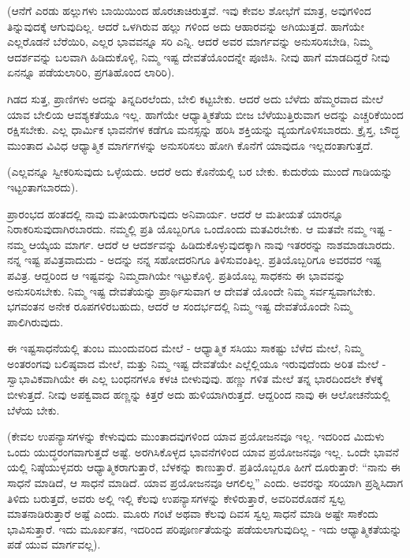 (ಆನೆಗೆ ಎರಡು ಹಲ್ಲುಗಳು ಬಾಯಿಯಿಂದ ಹೊರಚಾಚಿರುತ್ತವೆ. ಇವು ಕೇವಲ ಶೋಭೆಗೆ ಮಾತ್ರ, ಅವುಗಳಿಂದ ತಿನ್ನುವುದಕ್ಕೆ ಆಗುವುದಿಲ್ಲ. ಆದರೆ ಒಳಗಿರುವ ಹಲ್ಲು ಗಳಿಂದ ಅದು ಆಹಾರವನ್ನು ಅಗಿಯುತ್ತದೆ. ಹಾಗೆಯೇ ಎಲ್ಲರೊಡನೆ ಬೆರೆಯಿರಿ, ಎಲ್ಲರ ಭಾವವನ್ನೂ ಸರಿ ಎನ್ನಿ. ಆದರೆ ಅವರ ಮಾರ್ಗವನ್ನು ಅನುಸರಿಸಬೇಡಿ, ನಿಮ್ಮ ಆದರ್ಶವನ್ನು ಬಲವಾಗಿ ಹಿಡಿದುಕೊಳ್ಳಿ, ನಿಮ್ಮ ಇಷ್ಟ ದೇವತೆಯೊಂದನ್ನೇ ಪೂಜಿಸಿ. ನೀವು ಹಾಗೆ ಮಾಡದಿದ್ದರೆ ನೀವು ಏನನ್ನೂ ಪಡೆಯಲಾರಿರಿ, ಪ್ರಗತಿಹೊಂದ ಲಾರಿರಿ).

ಗಿಡದ ಸುತ್ತ, ಪ್ರಾಣಿಗಳು ಅದನ್ನು ತಿನ್ನದಿರಲೆಂದು, ಬೇಲಿ ಕಟ್ಟಬೇಕು. ಆದರೆ ಅದು ಬೆಳೆದು ಹೆಮ್ಮರವಾದ ಮೇಲೆ ಯಾವ ಬೇಲಿಯ ಆವಶ್ಯಕತೆಯೂ ಇಲ್ಲ. ಹಾಗೆಯೇ ಆಧ್ಯಾತ್ಮಿಕತೆಯ ಬೀಜ ಬೆಳೆಯುತ್ತಿರುವಾಗ ಅದನ್ನು ಎಚ್ಚರಿಕೆಯಿಂದ ರಕ್ಷಿಸಬೇಕು. ಎಲ್ಲ ಧಾರ್ಮಿಕ ಭಾವನೆಗಳ ಕಡೆಗೂ ಮನಸ್ಸನ್ನು ಹರಿಸಿ ಶಕ್ತಿಯನ್ನು ವ್ಯಯಗೊಳಿಸಬಾರದು. ಕ್ರೈಸ್ತ, ಬೌದ್ಧ ಮುಂತಾದ ವಿವಿಧ ಆಧ್ಯಾತ್ಮಿಕ ಮಾರ್ಗಗಳನ್ನು ಅನುಸರಿಸಲು ಹೋಗಿ ಕೊನೆಗೆ ಯಾವುದೂ ಇಲ್ಲದಂತಾಗುತ್ತದೆ.

(ಎಲ್ಲವನ್ನೂ ಸ್ವೀಕರಿಸುವುದು ಒಳ್ಳೆಯದು. ಆದರೆ ಅದು ಕೊನೆಯಲ್ಲಿ ಬರ ಬೇಕು. ಕುದುರೆಯ ಮುಂದೆ ಗಾಡಿಯನ್ನು ಇಟ್ಟಂತಾಗಬಾರದು).

ಪ್ರಾರಂಭದ ಹಂತದಲ್ಲಿ ನಾವು ಮತೀಯರಾಗುವುದು ಅನಿವಾರ್ಯ. ಆದರೆ ಆ ಮತೀಯತೆ ಯಾರನ್ನೂ ನಿರಾಕರಿಸುವುದಾಗಿರಬಾರದು. ನಮ್ಮಲ್ಲಿ ಪ್ರತಿ ಯೊಬ್ಬರಿಗೂ ಒಂದೊಂದು ಮತವಿರಬೇಕು. ಆ ಮತವೇ ನಮ್ಮ ಇಷ್ಟ - ನಮ್ಮ ಆಯ್ಕೆಯ ಮಾರ್ಗ. ಆದರೆ ಆ ಆದರ್ಶವನ್ನು ಹಿಡಿದುಕೊಳ್ಳುವುದಕ್ಕಾಗಿ ನಾವು ಇತರರನ್ನು ನಾಶಮಾಡಬಾರದು. ನನ್ನ ಇಷ್ಟ ಪವಿತ್ರವಾದುದು - ಅದನ್ನು ನನ್ನ ಸಹೋದರನಿಗೂ ತಿಳಿಸುವಂತಿಲ್ಲ. ಪ್ರತಿಯೊಬ್ಬರಿಗೂ ಅವರವರ ಇಷ್ಟ ಪವಿತ್ರ. ಆದ್ದರಿಂದ ಆ ಇಷ್ಟವನ್ನು ನಿಮ್ಮದಾಗಿಯೇ ಇಟ್ಟುಕೊಳ್ಳಿ. ಪ್ರತಿಯೊಬ್ಬ ಸಾಧಕನು ಈ ಭಾವವನ್ನು ಅನುಸರಿಸಬೇಕು. ನಿಮ್ಮ ಇಷ್ಟ ದೇವತೆಯನ್ನು ಪ್ರಾರ್ಥಿಸುವಾಗ ಆ ದೇವತೆ ಯೊಂದೇ ನಿಮ್ಮ ಸರ್ವಸ್ವವಾಗಬೇಕು. ಭಗವಂತನ ಅನೇಕ ರೂಪಗಳಿರಬಹುದು, ಆದರೆ ಆ ಸಂದರ್ಭದಲ್ಲಿ ನಿಮ್ಮ ಇಷ್ಟ ದೇವತೆಯೊಂದೇ ನಿಮ್ಮ ಪಾಲಿಗಿರುವುದು.

ಈ ಇಷ್ಟಸಾಧನೆಯಲ್ಲಿ ತುಂಬ ಮುಂದುವರಿದ ಮೇಲೆ - ಆಧ್ಯಾತ್ಮಿಕ ಸಸಿಯು ಸಾಕಷ್ಟು ಬೆಳೆದ ಮೇಲೆ, ನಿಮ್ಮ ಅಂತರಂಗವು ಬಲಿಷ್ಠವಾದ ಮೇಲೆ, ಮತ್ತು ನಿಮ್ಮ ಇಷ್ಟ ದೇವತೆಯೇ ಎಲ್ಲೆಲ್ಲಿಯೂ ಇರುವುದೆಂದು ಅರಿತ ಮೇಲೆ - ಸ್ವಾಭಾವಿಕವಾಗಿಯೇ ಈ ಎಲ್ಲ ಬಂಧನಗಳೂ ಕಳಚಿ ಬೀಳುವುವು. ಹಣ್ಣು ಗಳಿತ ಮೇಲೆ ತನ್ನ ಭಾರದಿಂದಲೇ ಕೆಳಕ್ಕೆ ಬೀಳುತ್ತದೆ. ನೀವು ಅಪಕ್ವವಾದ ಹಣ್ಣನ್ನು ಕಿತ್ತರೆ ಅದು ಹುಳಿಯಾಗಿರುತ್ತದೆ. ಆದ್ದರಿಂದ ನಾವು ಈ ಆಲೋಚನೆಯಲ್ಲಿ ಬೆಳೆಯ ಬೇಕು.

(ಕೇವಲ ಉಪನ್ಯಾಸಗಳನ್ನು ಕೇಳುವುದು ಮುಂತಾದವುಗಳಿಂದ ಯಾವ ಪ್ರಯೋಜನವೂ ಇಲ್ಲ. ಇದರಿಂದ ಮಿದುಳು ಒಂದು ಯುದ್ಧರಂಗವಾಗುತ್ತದೆ ಅಷ್ಟೆ. ಅರಗಿಸಿಕೊಳ್ಳದ ಭಾವನೆಗಳಿಂದ ಯಾವ ಪ್ರಯೋಜನವೂ ಇಲ್ಲ. ಒಂದೇ ಭಾವನೆ ಯಲ್ಲಿ ನಿಷ್ಠೆಯುಳ್ಳವರು ಆಧ್ಯಾತ್ಮಿಕರಾಗುತ್ತಾರೆ, ಬೆಳಕನ್ನು ಕಾಣುತ್ತಾರೆ. ಪ್ರತಿಯೊಬ್ಬರೂ ಹೀಗೆ ದೂರುತ್ತಾರೆ: “ನಾನು ಈ ಸಾಧನೆ ಮಾಡಿದೆ, ಆ ಸಾಧನೆ ಮಾಡಿದೆ. ಯಾವ ಪ್ರಯೋಜನವೂ ಆಗಲಿಲ್ಲ” ಎಂದು. ಅವರನ್ನು ಸರಿಯಾಗಿ ಪ್ರಶ್ನಿಸಿದಾಗ ತಿಳಿದು ಬರುತ್ತದೆ, ಅವರು ಅಲ್ಲಿ ಇಲ್ಲಿ ಕೆಲವು ಉಪನ್ಯಾಸಗಳನ್ನು ಕೇಳಿರುತ್ತಾರೆ, ಅವರಿವರೊಡನೆ ಸ್ವಲ್ಪ ಮಾತನಾಡಿರುತ್ತಾರೆ ಅಷ್ಟೆ ಎಂದು. ಮೂರು ಗಂಟೆ ಅಥವಾ ಕೆಲವು ದಿವಸ ಸ್ವಲ್ಪ ಸಾಧನೆ ಮಾಡಿ ಅಷ್ಟೇ ಸಾಕೆಂದು ಭಾವಿಸುತ್ತಾರೆ. ಇದು ಮೂರ್ಖತನ, ಇದರಿಂದ ಪರಿಪೂರ್ಣತೆಯನ್ನು ಪಡೆಯಲಾಗುವುದಿಲ್ಲ - ಇದು ಆಧ್ಯಾತ್ಮಿಕತೆಯನ್ನು ಪಡೆ ಯುವ ಮಾರ್ಗವಲ್ಲ).

